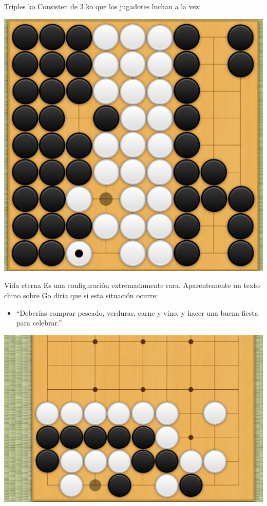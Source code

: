 \documentclass{beamer}
\begin{document}
\begin{frame}{Triples ko}
    Consisten de 3 ko que los jugadores luchan a la vez:
    
    \includegraphics[scale=0.2]{triple-ko.png}
    
\end{frame}

\begin{frame}{Vida eterna}
    Es una configuración extremadamente rara. Aparentemente un texto chino sobre Go diría que si esta situación ocurre:
    
    \begin{itemize}
        \item ``Deberías comprar pescado, verduras, carne y vino, y hacer una buena fiesta para celebrar.''
    \end{itemize}
    
    \includegraphics[scale=0.2]{vida-eterna.png}
    
\end{frame}
\end{document}
